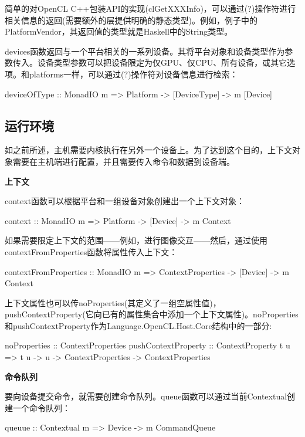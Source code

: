 简单的对OpenCL C++包装API的实现(clGetXXXInfo)，可以通过(?)操作符进行相关信息的返回(需要额外的层提供明确的静态类型)。例如，例子中的PlatformVendor，其返回值的类型就是Haskell中的String类型。

devices函数返回与一个平台相关的一系列设备。其将平台对象和设备类型作为参数传入。设备类型参数可以把设备限定为仅GPU、仅CPU、所有设备，或其它选项。和platforms一样，可以通过(?)操作符对设备信息进行检索：

\begin{codebox}[haskell]
deviceOfType :: MonadIO m => Platform -> [DeviceType] -> m [Device]
\end{codebox}

\subsection{运行环境}

如之前所述，主机需要内核执行在另外一个设备上。为了达到这个目的，上下文对象需要在主机端进行配置，并且需要传入命令和数据到设备端。

\textbf{上下文}

context函数可以根据平台和一组设备对象创建出一个上下文对象：

\begin{codebox}[haskell]
context :: MonadIO m => Platform -> [Device] -> m Context
\end{codebox}

如果需要限定上下文的范围——例如，进行图像交互——然后，通过使用contextFromProperties函数将属性传入上下文：

\begin{codebox}[haskell]
contextFromProperties :: MonadIO m => ContextProperties -> [Device] -> m Context
\end{codebox}

上下文属性也可以传noProperties(其定义了一组空属性值)，pushContextProperty(它向已有的属性集合中添加一个上下文属性)。noProperties和pushContextProperty作为Language.OpenCL.Host.Core结构中的一部分:

\begin{codebox}[haskell]
noProperties :: ContextProperties
pushContextProperty :: ContextProperty t u => t u -> u -> ContextProperties -> ContextProperties
\end{codebox}

\textbf{命令队列}

要向设备提交命令，就需要创建命令队列。queue函数可以通过当前Contextual创建一个命令队列：

\begin{codebox}[haskell]
queuue :: Contextual m => Device -> m CommandQueue
\end{codebox}

